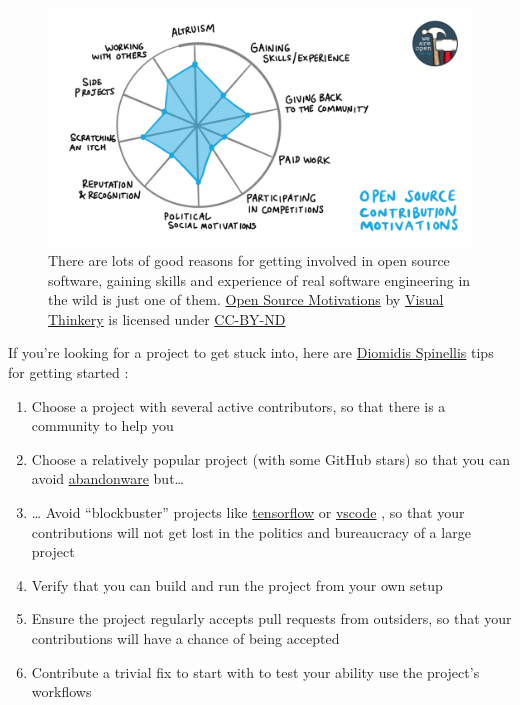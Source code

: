 \documentclass[
]{book}
\providecommand{\tightlist}{%
  \setlength{\itemsep}{0pt}\setlength{\parskip}{0pt}}
\begin{document}
\begin{figure}

{\centering \includegraphics[width=1\linewidth]{images/OS-contribution-motivations-1200x675} 

}

\caption{There are lots of good reasons for getting involved in open source software, gaining skills and experience of real software engineering in the wild is just one of them. \href{https://bryanmmathers.com/open-source-motivations}{Open Source Motivations} by \href{https://visualthinkery.com}{Visual Thinkery} is licensed under \href{https://creativecommons.org/licenses/by-nd/4.0/}{CC-BY-ND}}\label{fig:opensource-fig}
\end{figure}



If you're looking for a project to get stuck into, here are \href{https://en.wikipedia.org/wiki/Diomidis_Spinellis}{Diomidis Spinellis} tips for getting started \citep{sigman18}:

\begin{enumerate}
\def\labelenumi{\arabic{enumi}.}
\tightlist
\item
  Choose a project with several active contributors, so that there is a community to help you
\item
  Choose a relatively popular project (with some GitHub stars) so that you can avoid \href{https://en.wikipedia.org/wiki/Abandonware}{abandonware} but\ldots{}
\item
  \ldots{} Avoid ``blockbuster'' projects like \href{https://github.com/tensorflow}{tensorflow} or \href{https://github.com/microsoft/vscode}{vscode} , so that your contributions will not get lost in the politics and bureaucracy of a large project
\item
  Verify that you can build and run the project from your own setup
\item
  Ensure the project regularly accepts pull requests from outsiders, so that your contributions will have a chance of being accepted
\item
  Contribute a trivial fix to start with to test your ability use the project's workflows
\end{enumerate}
\end{document}

